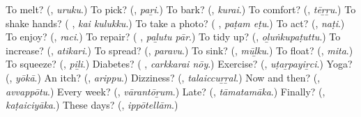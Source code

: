 \begin{tcolorbox}[breakable,colback=teal!4,colframe=teal!35!black,title={Before you move on}]
To melt? (\textbf{}, \emph{uruku}.) To pick? (\textbf{}, \emph{paṟi}.) To bark? (\textbf{}, \emph{kurai}.) To comfort? (\textbf{}, \emph{tēṟṟu}.) To shake hands? (\textbf{ }, \emph{kai kulukku}.) To take a photo? (\textbf{ }, \emph{paṭam eṭu}.) To act? (\textbf{}, \emph{naṭi}.) To enjoy? (\textbf{}, \emph{raci}.) To repair? (\textbf{ }, \emph{paḻutu pār}.) To tidy up? (\textbf{}, \emph{oḻuṅkupaṭuttu}.) To increase? (\textbf{}, \emph{atikari}.) To spread? (\textbf{}, \emph{paravu}.) To sink? (\textbf{}, \emph{mūḻku}.) To float? (\textbf{}, \emph{mita}.) To squeeze? (\textbf{}, \emph{piḻi}.) Diabetes? (\textbf{ }, \emph{carkkarai nōy}.) Exercise? (\textbf{}, \emph{uṭaṟpayiṟci}.) Yoga? (\textbf{}, \emph{yōkā}.) An itch? (\textbf{}, \emph{arippu}.) Dizziness? (\textbf{}, \emph{talaiccuṟṟal}.) Now and then? (\textbf{}, \emph{avvappōtu}.) Every week? (\textbf{}, \emph{vārantōṟum}.) Late? (\textbf{}, \emph{tāmatamāka}.) Finally? (\textbf{}, \emph{kaṭaiciyāka}.) These days? (\textbf{}, \emph{ippōtellām}.)
\end{tcolorbox}
